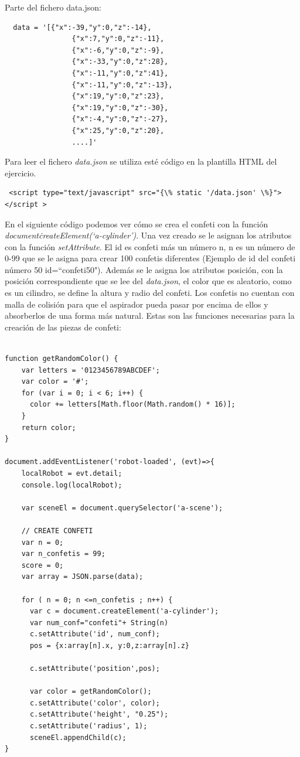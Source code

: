 Parte del fichero data.json: 
\begin{lstlisting}
  data = '[{"x":-39,"y":0,"z":-14},
                {"x":7,"y":0,"z":-11},
                {"x":-6,"y":0,"z":-9},
                {"x":-33,"y":0,"z":28},
                {"x":-11,"y":0,"z":41},
                {"x":-11,"y":0,"z":-13},
                {"x":19,"y":0,"z":23},
                {"x":19,"y":0,"z":-30},
                {"x":-4,"y":0,"z":-27},
                {"x":25,"y":0,"z":20},
                ....]'
 \end{lstlisting}


Para leer el fichero \textit{data.json} se utiliza esté código en la plantilla HTML del ejercicio.
\begin{lstlisting}
 <script type="text/javascript" src="{\% static '/data.json' \%}"></script > 
 \end{lstlisting}


En el siguiente código podemos ver cómo se crea el confeti con la función \textit{document\.createElement(`a-cylinder')}. Una vez creado se le asignan los atributos con la función  \textit{setAttribute}.  El id es confeti más un número  n, n es un número de 0-99 que se le asigna para crear 100 confetis diferentes (Ejemplo de id del confeti número 50   id=``confeti50"). Además se le asigna los atributos posición, con la posición correspondiente que se lee del \textit{data.json}, el color que es  aleatorio, como es un cilindro, se define la altura y radio del confeti.
Los confetis no cuentan con malla de colisión para que el aspirador pueda pasar por encima de ellos y absorberlos de una forma más natural.
Estas son las funciones necesarias para la creación de las piezas de confeti: 
\begin{lstlisting}

function getRandomColor() {
    var letters = '0123456789ABCDEF';
    var color = '#';
    for (var i = 0; i < 6; i++) {
      color += letters[Math.floor(Math.random() * 16)];
    }
    return color;
}

document.addEventListener('robot-loaded', (evt)=>{
    localRobot = evt.detail;
    console.log(localRobot);

    var sceneEl = document.querySelector('a-scene');

    // CREATE CONFETI
    var n = 0;
    var n_confetis = 99;
    score = 0;
    var array = JSON.parse(data);

    for ( n = 0; n <=n_confetis ; n++) {
      var c = document.createElement('a-cylinder');
      var num_conf="confeti"+ String(n)
      c.setAttribute('id', num_conf);
      pos = {x:array[n].x, y:0,z:array[n].z}
    
      c.setAttribute('position',pos);
    
      var color = getRandomColor();
      c.setAttribute('color', color);
      c.setAttribute('height', "0.25");
      c.setAttribute('radius', 1);
      sceneEl.appendChild(c);
}
\end{lstlisting}


